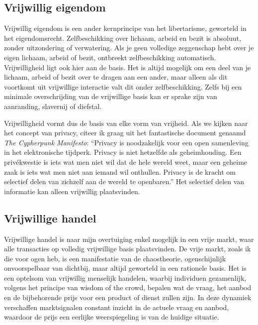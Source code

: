 \subsection{Vrijwillig eigendom}

Vrijwillig eigendom is een ander kernprincipe van het libertarisme, geworteld in het eigendomsrecht. Zelfbeschikking over lichaam, arbeid en bezit is absoluut, zonder uitzondering of verwatering. Als je geen volledige zeggenschap hebt over je eigen lichaam, arbeid of bezit, ontbreekt zelfbeschikking automatisch. Vrijwilligheid ligt ook hier aan de basis. Het is altijd mogelijk om een deel van je lichaam, arbeid of bezit over te dragen aan een ander, maar alleen als dit voortkomt uit vrijwillige interactie valt dit onder zelfbeschikking. Zelfs bij een minimale overschrijding van de vrijwillige basis kan er sprake zijn van aanranding, slavernij of diefstal.

Vrijwilligheid vormt dus de basis van elke vorm van vrijheid. Als we kijken naar het concept van privacy, citeer ik graag uit het fantastische document genaamd \emph{The Cypherpunk Manifesto}: ``Privacy is noodzakelijk voor een open samenleving in het elektronische tijdperk. Privacy is niet hetzelfde als geheimhouding. Een privékwestie is iets wat men niet wil dat de hele wereld weet, maar een geheime zaak is iets wat men niet aan iemand wil onthullen. Privacy is de kracht om selectief delen van zichzelf aan de wereld te openbaren.'' Het selectief delen van informatie kan alleen vrijwillig plaatsvinden.

\subsection{Vrijwillige handel}

Vrijwillige handel is naar mijn overtuiging enkel mogelijk in een vrije markt, waar alle transacties op volledig vrijwillige basis plaatsvinden. De vrije markt, zoals ik die voor ogen heb, is een manifestatie van de chaostheorie, ogenschijnlijk onvoorspelbaar van dichtbij, maar altijd geworteld in een rationele basis. Het is een optelsom van vrijwillig menselijk handelen, waarbij individuen gezamenlijk, volgens het principe van \textquotesingle wisdom of the crowd\textquotesingle, bepalen wat de vraag, het aanbod en de bijbehorende prijs voor een product of dienst zullen zijn. In deze dynamiek verschaffen marktsignalen constant inzicht in de actuele vraag en aanbod, waardoor de prijs een eerlijke weerspiegeling is van de huidige situatie.


